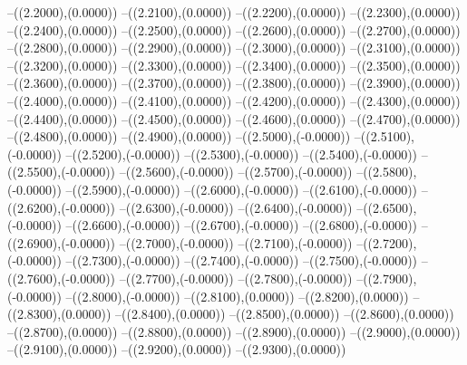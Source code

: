 {	--({\sx*(2.2000)},{\sy*(0.0000)})
	--({\sx*(2.2100)},{\sy*(0.0000)})
	--({\sx*(2.2200)},{\sy*(0.0000)})
	--({\sx*(2.2300)},{\sy*(0.0000)})
	--({\sx*(2.2400)},{\sy*(0.0000)})
	--({\sx*(2.2500)},{\sy*(0.0000)})
	--({\sx*(2.2600)},{\sy*(0.0000)})
	--({\sx*(2.2700)},{\sy*(0.0000)})
	--({\sx*(2.2800)},{\sy*(0.0000)})
	--({\sx*(2.2900)},{\sy*(0.0000)})
	--({\sx*(2.3000)},{\sy*(0.0000)})
	--({\sx*(2.3100)},{\sy*(0.0000)})
	--({\sx*(2.3200)},{\sy*(0.0000)})
	--({\sx*(2.3300)},{\sy*(0.0000)})
	--({\sx*(2.3400)},{\sy*(0.0000)})
	--({\sx*(2.3500)},{\sy*(0.0000)})
	--({\sx*(2.3600)},{\sy*(0.0000)})
	--({\sx*(2.3700)},{\sy*(0.0000)})
	--({\sx*(2.3800)},{\sy*(0.0000)})
	--({\sx*(2.3900)},{\sy*(0.0000)})
	--({\sx*(2.4000)},{\sy*(0.0000)})
	--({\sx*(2.4100)},{\sy*(0.0000)})
	--({\sx*(2.4200)},{\sy*(0.0000)})
	--({\sx*(2.4300)},{\sy*(0.0000)})
	--({\sx*(2.4400)},{\sy*(0.0000)})
	--({\sx*(2.4500)},{\sy*(0.0000)})
	--({\sx*(2.4600)},{\sy*(0.0000)})
	--({\sx*(2.4700)},{\sy*(0.0000)})
	--({\sx*(2.4800)},{\sy*(0.0000)})
	--({\sx*(2.4900)},{\sy*(0.0000)})
	--({\sx*(2.5000)},{\sy*(-0.0000)})
	--({\sx*(2.5100)},{\sy*(-0.0000)})
	--({\sx*(2.5200)},{\sy*(-0.0000)})
	--({\sx*(2.5300)},{\sy*(-0.0000)})
	--({\sx*(2.5400)},{\sy*(-0.0000)})
	--({\sx*(2.5500)},{\sy*(-0.0000)})
	--({\sx*(2.5600)},{\sy*(-0.0000)})
	--({\sx*(2.5700)},{\sy*(-0.0000)})
	--({\sx*(2.5800)},{\sy*(-0.0000)})
	--({\sx*(2.5900)},{\sy*(-0.0000)})
	--({\sx*(2.6000)},{\sy*(-0.0000)})
	--({\sx*(2.6100)},{\sy*(-0.0000)})
	--({\sx*(2.6200)},{\sy*(-0.0000)})
	--({\sx*(2.6300)},{\sy*(-0.0000)})
	--({\sx*(2.6400)},{\sy*(-0.0000)})
	--({\sx*(2.6500)},{\sy*(-0.0000)})
	--({\sx*(2.6600)},{\sy*(-0.0000)})
	--({\sx*(2.6700)},{\sy*(-0.0000)})
	--({\sx*(2.6800)},{\sy*(-0.0000)})
	--({\sx*(2.6900)},{\sy*(-0.0000)})
	--({\sx*(2.7000)},{\sy*(-0.0000)})
	--({\sx*(2.7100)},{\sy*(-0.0000)})
	--({\sx*(2.7200)},{\sy*(-0.0000)})
	--({\sx*(2.7300)},{\sy*(-0.0000)})
	--({\sx*(2.7400)},{\sy*(-0.0000)})
	--({\sx*(2.7500)},{\sy*(-0.0000)})
	--({\sx*(2.7600)},{\sy*(-0.0000)})
	--({\sx*(2.7700)},{\sy*(-0.0000)})
	--({\sx*(2.7800)},{\sy*(-0.0000)})
	--({\sx*(2.7900)},{\sy*(-0.0000)})
	--({\sx*(2.8000)},{\sy*(-0.0000)})
	--({\sx*(2.8100)},{\sy*(0.0000)})
	--({\sx*(2.8200)},{\sy*(0.0000)})
	--({\sx*(2.8300)},{\sy*(0.0000)})
	--({\sx*(2.8400)},{\sy*(0.0000)})
	--({\sx*(2.8500)},{\sy*(0.0000)})
	--({\sx*(2.8600)},{\sy*(0.0000)})
	--({\sx*(2.8700)},{\sy*(0.0000)})
	--({\sx*(2.8800)},{\sy*(0.0000)})
	--({\sx*(2.8900)},{\sy*(0.0000)})
	--({\sx*(2.9000)},{\sy*(0.0000)})
	--({\sx*(2.9100)},{\sy*(0.0000)})
	--({\sx*(2.9200)},{\sy*(0.0000)})
	--({\sx*(2.9300)},{\sy*(0.0000)})
}
